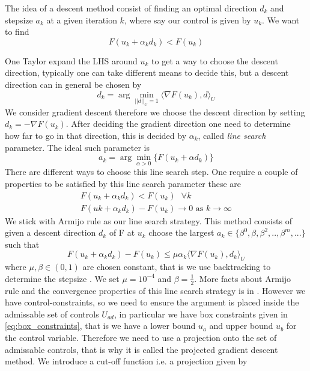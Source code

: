 The idea of a descent method consist of finding an optimal direction $d_k$ and stepsize $a_k$ at a given iteration $k$, where say our control is given by $u_k$. We want to find
\begin{equation*}
    F(u_k + \alpha_kd_k) < F(u_k)
\end{equation*}

One Taylor expand the LHS around $u_k$ to get a way to choose the descent direction, typically one can take different means to decide this, but a descent direction can in general be chosen by 
\begin{equation*}
    d_k = \arg\min_{||d||_U=1} \langle \nabla F(u_k), d \rangle_U
\end{equation*}
We consider gradient descent therefore we choose the descent direction by setting $d_k = -\nabla F(u_k)$. After deciding the gradient direction one need to determine how far to go in that direction, this is decided by $\alpha_k$, called \textit{line search} parameter. The ideal such parameter is 
\begin{equation*}
    a_k = \arg \min_{\alpha>0} \{ F(u_k + \alpha d_k) \}
\end{equation*}
There are different ways to choose this line search step. One require a couple of properties to be satisfied by this line search parameter these are
\begin{align*}
    F(u_k + \alpha_kd_k) < F(u_k) \text{  } \forall k \\
    F(uk + \alpha_k d_k) - F(u_k) \rightarrow 0 \text{ as } k\rightarrow \infty
\end{align*}
We stick with Armijo rule as our line search strategy. This method consists of given a descent direction $d_k$ of F at $u_k$ choose the largest $a_k \in \{ \beta^0, \beta, \beta^2,..,\beta^m,... \}$ such that
\begin{equation}\label{eq:armijo}
    F (u_k + \alpha_kd_k) - F(u_k) \leq \mu \alpha_k \langle \nabla F(u_k),d_k \rangle_{U}
\end{equation}
where $\mu,\beta  \in (0,1)$ are chosen constant, that is we use backtracking to determine the stepsize \cite{iterativeMethods}. We set $\mu = 10^{-4}$ and $\beta = \frac{1}{2}$. More facts about Armijo rule and the convergence properties of this line search strategy is in \cite{numMethods} \cite{iterativeMethods}. However we have control-constraints, so we need to ensure the argument is placed inside the admissable set of controls $U_{ad}$, in particular we have box constraints given in \eqref{eq:box_constraints}, that is we have a lower bound $u_a$ and upper bound $u_b$ for the control variable. Therefore we need to use a projection onto the set of admissable controls, that is why it is called the projected gradient descent method. We introduce a cut-off function i.e. a projection given by
